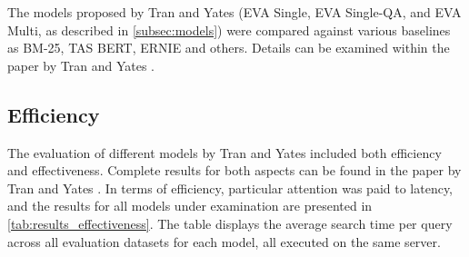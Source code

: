 The models proposed by Tran and Yates (EVA Single, EVA Single-QA, and EVA Multi, as described in \autoref{subsec:models}) were compared against various baselines as BM-25, TAS BERT, ERNIE and others. Details can be examined within the paper by Tran and Yates \cite{tran2022dense}.

\subsection{Efficiency}\label{sec:efficiency}

The evaluation of different models by Tran and Yates included both efficiency and effectiveness. Complete results for both aspects can be found in the paper by Tran and Yates \cite{tran2022dense}. In terms of efficiency, particular attention was paid to latency, and the results for all models under examination are presented in \autoref{tab:results_effectiveness}. The table displays the average search time per query across all evaluation datasets for each model, all executed on the same server.

